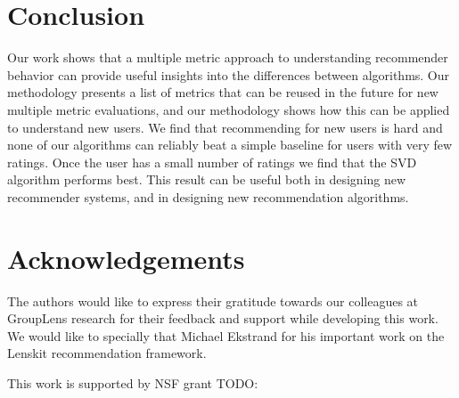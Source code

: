 \documentclass[letterpaper]{sig-alternate}
\begin{document}


\section{Conclusion}

  Our work shows that a multiple metric approach to understanding recommender behavior can provide useful insights into the differences between algorithms.
  Our methodology presents a list of metrics that can be reused in the future for new multiple metric evaluations, and our methodology shows how this can be applied to understand new users.
  We find that recommending for new users is hard and none of our algorithms can reliably beat a simple baseline for users with very few ratings.
  Once the user has a small number of ratings we find that the SVD algorithm performs best.
  This result can be useful both in designing new recommender systems, and in designing new recommendation algorithms.


\section{Acknowledgements}
  
  The authors would like to express their gratitude towards our colleagues at GroupLens research for their feedback and support while developing this work.
  We would like to specially that Michael Ekstrand for his  important work on the Lenskit recommendation framework.

  This work is supported by NSF grant TODO:


\end{document}

